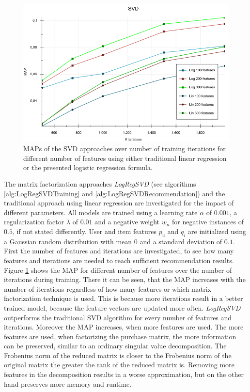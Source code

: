 \documentclass[10pt]{reportMaster}
\begin{document}
\begin{figure}
	\centering
	\includegraphics[width=1\textwidth]{figures/experiments/SVDIterations}
	\caption{MAPs of the SVD approaches over number of training iterations for different number of features using either traditional linear regression or the presented logistic regression formula.}
	\label{fig:SVDIterations}
\end{figure}

The matrix factorization approaches \textit{LogRegSVD} (see algorithms \ref{alg:LogRegSVDTraining} and \ref{alg:LogRegSVDRecommendation}) and the traditional approach using linear regression are investigated for the impact of different parameters.
All models are trained using a learning rate $\alpha$ of $0.001$, a regularization factor $\lambda$ of $0.01$ and a negative weight $w_n$ for negative instances of $0.5$, if not stated differently.
User and item features $p_u$ and $q_i$ are initialized using a Gaussian random distribution with mean 0 and a standard deviation of $0.1$.
First the number of features and iterations are investigated, to see how many features and iterations are needed to reach sufficient recommendation results.
Figure \ref{fig:SVDIterations} shows the MAP for different number of features over the number of iterations during training.
There it can be seen, that the MAP increases with the number of iterations regardless of how many features or which matrix factorization technique is used.
This is because more iterations result in a better trained model, because the feature vectors are updated more often.
\textit{LogRegSVD} outperforms the traditional SVD algorithm for every number of features and iterations.
Moreover the MAP increases, when more features are used.
The more features are used, when factorizing the purchase matrix, the more information can be preserved, similar to an ordinary singular value decomposition.
The Frobenius norm of the reduced matrix is closer to the Frobenius norm of the original matrix the greater the rank of the reduced matrix is.
Removing more features in the decomposition results in a worse approximation, but on the other hand preserves more memory and runtime.
\end{document}

